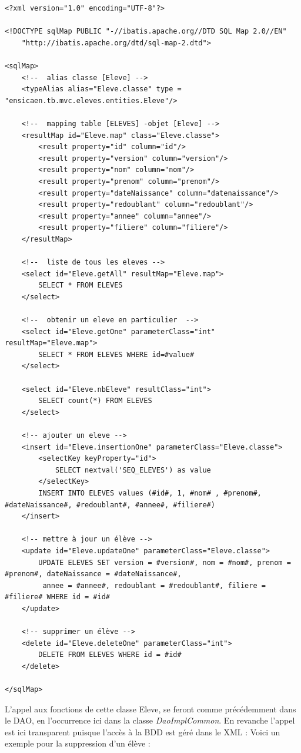 \documentclass[a4paper,12pt]{article}
\begin{document}
\begin{lstlisting}
<?xml version="1.0" encoding="UTF-8"?>

<!DOCTYPE sqlMap PUBLIC "-//ibatis.apache.org//DTD SQL Map 2.0//EN"
	"http://ibatis.apache.org/dtd/sql-map-2.dtd">
	
<sqlMap>
	<!--  alias classe [Eleve] -->
	<typeAlias alias="Eleve.classe" type = "ensicaen.tb.mvc.eleves.entities.Eleve"/>
	
	<!--  mapping table [ELEVES] -objet [Eleve] -->
	<resultMap id="Eleve.map" class="Eleve.classe">
		<result property="id" column="id"/>
		<result property="version" column="version"/>
		<result property="nom" column="nom"/>
		<result property="prenom" column="prenom"/>
		<result property="dateNaissance" column="datenaissance"/>
		<result property="redoublant" column="redoublant"/>
		<result property="annee" column="annee"/>
		<result property="filiere" column="filiere"/>		
	</resultMap>
	
	<!--  liste de tous les eleves -->
	<select id="Eleve.getAll" resultMap="Eleve.map">
		SELECT * FROM ELEVES
	</select>
	
	<!--  obtenir un eleve en particulier  -->
	<select id="Eleve.getOne" parameterClass="int" resultMap="Eleve.map">
		SELECT * FROM ELEVES WHERE id=#value#
	</select>
	
	<select id="Eleve.nbEleve" resultClass="int">
		SELECT count(*) FROM ELEVES
	</select>
	
	<!-- ajouter un eleve -->
	<insert id="Eleve.insertionOne" parameterClass="Eleve.classe">
		<selectKey keyProperty="id">
			SELECT nextval('SEQ_ELEVES') as value
		</selectKey>
		INSERT INTO ELEVES values (#id#, 1, #nom# , #prenom#, #dateNaissance#, #redoublant#, #annee#, #filiere#)
	</insert>
	
	<!-- mettre à jour un élève -->
	<update id="Eleve.updateOne" parameterClass="Eleve.classe">
		UPDATE ELEVES SET version = #version#, nom = #nom#, prenom = #prenom#, dateNaissance = #dateNaissance#,
		 annee = #annee#, redoublant = #redoublant#, filiere = #filiere# WHERE id = #id#
	</update>
	
	<!-- supprimer un élève -->
	<delete id="Eleve.deleteOne" parameterClass="int">
		DELETE FROM ELEVES WHERE id = #id#
	</delete>

</sqlMap>
\end{lstlisting}

L'appel aux fonctions de cette classe Eleve, se feront comme précédemment dans le DAO, en l'occurrence ici dans la classe \textit{DaoImplCommon}.
En revanche l'appel est ici transparent puisque l'accès à la BDD est géré dans le XML :
Voici un exemple pour la suppression d'un élève :
\end{document}
